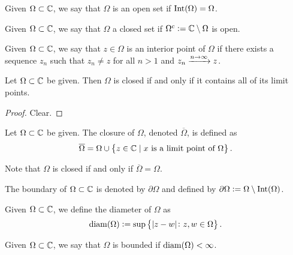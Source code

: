 \documentclass[11pt,a4paper]{article}
\begin{document}
\begin{definition}
  Given $\Omega \subset \mathbb{C}$, we say that $\Omega$ is an open set if
  $\operatorname{Int}(\Omega) = \Omega$.
\end{definition}

\begin{definition}
  Given $\Omega \subset \mathbb{C}$, we say that $\Omega$ a closed set if
  $\Omega^c := \mathbb{C} \setminus \Omega$ is open.
\end{definition}

\begin{definition}
  Given $\Omega \subset \mathbb{C}$, we say that $z \in \Omega$ is an interior
  point of $\Omega$ if there exists a sequence $z_n$ such that
  $z_n \neq z$ for all $n > 1$ and $z_n \xrightarrow{n \to \infty} z$.
\end{definition}

\begin{proposition}
  Let $\Omega \subset \mathbb{C}$ be given.
  Then $\Omega$ is closed if and only if it contains
  all of its limit points.
\end{proposition}
\begin{proof}
  Clear.
\end{proof}

\begin{definition}[Closure]
  Let $\Omega \subset \mathbb{C}$ be given.
  The closure of $\Omega$, denoted $\overline \Omega$, is defined
  as
  \[
      \overline \Omega =
      \Omega \cup
      \set{z \in \mathbb{C}\mid \text{$x$ is a limit point of $\Omega$}}.
  \]
\end{definition}

\begin{remark}
  Note that $\Omega$ is closed if and only if $\overline \Omega = \Omega$.
\end{remark}

\begin{definition}[Boundary]
  The boundary of $\Omega \subset \mathbb{C}$ is denoted by $\partial \Omega$
  and defined by $\partial \Omega := \Omega \setminus \operatorname{Int}(\Omega)$.
\end{definition}

\begin{definition}[Diameter]
  Given $\Omega \subset \mathbb{C}$, we define the diameter of $\Omega$ as
  \[
      \operatorname{diam}(\Omega) := \sup\set{|z - w| \colon z,w \in \Omega}.
  \]
\end{definition}

\begin{definition}
  Given $\Omega \subset \mathbb{C}$, we say that $\Omega$ is bounded if
  $\operatorname{diam}(\Omega) < \infty$.
\end{definition}
\end{document}
